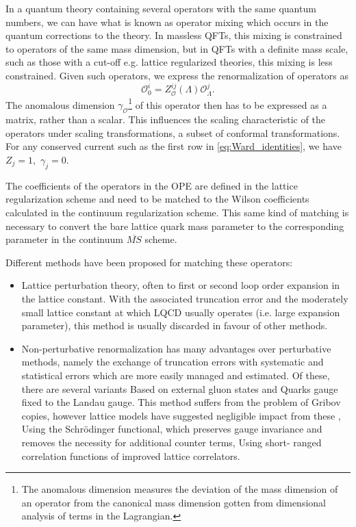 \documentclass[a4paper,10pt]{article}
\begin{document}
In a quantum theory containing several operators with the same quantum numbers, we can have what is known as operator mixing which occurs in the quantum corrections to the theory. In massless QFTs, this mixing is constrained to operators of the same mass dimension, but in QFTs with a definite mass scale, such as those with a cut-off e.g. lattice regularized theories, this mixing is less constrained. Given such operators, we express the renormalization of operators as
\begin{equation}
\mathcal{O}_{0}^{i}=Z_{\mathcal{O}}^{i j}(\Lambda) \mathcal{O}_{\Lambda}^{j}.
\end{equation}
The anomalous dimension $\gamma_\mathcal{O}$\footnote{The anomalous dimension measures the deviation of the mass dimension of an operator from the canonical mass dimension gotten from dimensional analysis of terms in the Lagrangian.} of this operator then has to be expressed as a matrix, rather than a scalar. This influences the scaling characteristic of the operators under scaling transformations, a subset of conformal transformations. For any conserved current such as the first row in \eqref{eq:Ward_identities}, we have $Z_{j} = 1, \,\, \gamma_j=0$.

 The coefficients of the operators in the OPE are defined in the lattice regularization scheme and need to be matched to the Wilson coefficients calculated in the continuum regularization scheme. This same kind of matching is necessary to convert the bare lattice quark mass parameter to the corresponding parameter in the continuum $\overline{MS}$ scheme.

Different methods have been proposed for matching these operators:
\begin{itemize}
\item Lattice perturbation theory, often to first or second loop order expansion in the lattice constant. With the associated truncation error and the moderately small lattice constant at which LQCD usually operates (i.e. large expansion parameter), this method is usually discarded in favour of other methods.
\item Non-perturbative renormalization has many advantages over perturbative methods, namely the exchange of truncation errors with systematic and statistical errors which are more easily managed and estimated. Of these, there are several variants
\subitem Based on external gluon states and Quarks gauge fixed to the Landau gauge\cite{Martinelli_1995}. This method suffers from the problem of Gribov copies, however lattice models have suggested negligible impact from these \cite{giusti2001problems},
\subitem Using the Schrödinger functional, which preserves gauge invariance and removes the necessity for additional counter terms\cite{L_scher_1992},
\subitem Using short- ranged correlation functions of improved lattice correlators\cite{MARTINELLI1997141}.
\end{itemize}
\end{document}

